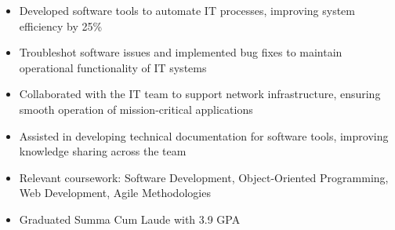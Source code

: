 \par\smallskip
\begin{minipage}{13.75cm}
  \begin{minipage}{6.5cm}
    \begin{itemize}
      \item Developed software tools to automate IT processes, improving system efficiency by 25\%
      \item Troubleshot software issues and implemented bug fixes to maintain operational functionality of IT systems
    \end{itemize}
  \end{minipage}
  \hfill
  \begin{minipage}{6.5cm}
    \begin{itemize}
      \item Collaborated with the IT team to support network infrastructure, ensuring smooth operation of mission-critical applications
      \item Assisted in developing technical documentation for software tools, improving knowledge sharing across the team
    \end{itemize}
  \end{minipage}
\end{minipage}

\par\bigskip
{}
\begin{itemize}
  \item Relevant coursework: Software Development, Object-Oriented Programming, Web Development, Agile Methodologies
\end{itemize}
\divider

\begin{itemize}
  \item Graduated Summa Cum Laude with 3.9 GPA
\end{itemize}


